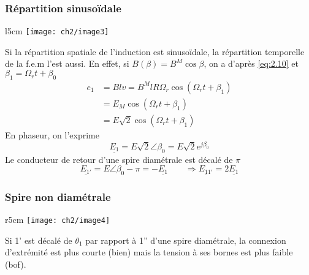 		\subsubsection{Répartition sinusoïdale}
			\begin{wrapfigure}[5]{l}{5cm}
			\vspace{-5mm}
			\texttt{[image: ch2/image3]} 
			\end{wrapfigure}
		Si la répartition spatiale de l'induction est sinusoïdale, la répartition temporelle de la f.e.m l'est aussi. En effet, si $B(\beta )= B^M\cos \beta$, on a d'après \autoref{eq:2.10} et $\beta _1 = \Omega _r t + \beta _0$
			\begin{equation}
			\begin{aligned}
				e_1 &= Blv = B^M lR\Omega _r \cos (\Omega _r t + \beta _1)\\
				 &= E_M \cos (\Omega _r t + \beta _1) \\
				 &= E\sqrt{2}\cos (\Omega _r t + \beta _1)
				\end{aligned}
			\end{equation}
		En phaseur, on l'exprime 
		\begin{equation}
			\underline{E_1} = E\sqrt{2} \angle \beta _0 = E\sqrt{2} e^{j\beta _0}
		\end{equation}
		Le conducteur de retour d'une spire diamétrale est décalé de $\pi$		
		\begin{equation}
			\underline{E_{1'}} = E\angle \beta _0 -\pi = -\underline{E_1}\qquad \Rightarrow \underline{E_{11'}} = 2\underline{E_1}
		\end{equation}
		
		\subsubsection{Spire non diamétrale}
			\begin{wrapfigure}[6]{r}{5cm}
			\vspace{-5mm}
			\texttt{[image: ch2/image4]} 
			\end{wrapfigure}
			Si 1' est décalé de $\theta_1$ par rapport à 1'' d'une spire 
			diamétrale, la connexion d'extrémité est plus courte (bien) 
			mais la tension à ses bornes est plus faible (bof).\\\\
		
